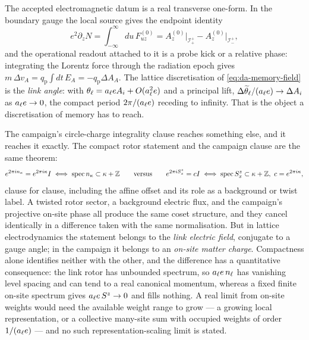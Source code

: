The accepted electromagnetic datum is a real transverse one-form. In the
boundary gauge the local source gives the endpoint identity
\begin{equation}
  e^2\partial_zN=\int_{-\infty}^{\infty}du\,F^{(0)}_{uz}
  =A^{(0)}_z\big|_{\mathcal I^+_+}-A^{(0)}_z\big|_{\mathcal I^+_-},
  \label{eq:da-memory-field}
\end{equation}
and the operational readout attached to it is a probe kick or a relative phase:
integrating the Lorentz force through the radiation epoch gives
$m\,\Delta v_A=q_{\mathrm p}\int dt\,E_A=-q_{\mathrm p}\Delta A_A$. The lattice
discretisation of \eqref{eq:da-memory-field} is the \emph{link angle}: with
$\theta_\ell=a_{\ell} e A_i+O(a_{\ell}^2e)$ and a principal lift,
$\Delta\widetilde\theta_\ell/(a_{\ell} e)\to\Delta A_i$ as $a_{\ell} e\to0$,
the compact period $2\pi/(a_{\ell} e)$ receding to infinity. That is the
object a discretisation of memory has to reach.

The campaign's circle-charge integrality clause reaches something else, and it
reaches it exactly. The compact rotor statement and the campaign clause are the
same theorem:
\begin{equation}
  e^{2\pi in_\kappa}=e^{2\pi i\kappa}I
  \iff
  \operatorname{spec} n_\kappa\subset\kappa+\mathbb{Z}
  \qquad\text{versus}\qquad
  e^{2\pi iS^z_x}=cI
  \iff
  \operatorname{spec} S^z_x\subset\kappa+\mathbb{Z},\ c=e^{2\pi i\kappa},
  \label{eq:da-int-clause}
\end{equation}
clause for clause, including the affine offset and its role as a background or
twist label. A twisted rotor sector, a background electric flux, and the
campaign's projective on-site phase all produce the same coset structure, and
they cancel identically in a difference taken with the same normalisation. But
in lattice electrodynamics the statement belongs to the \emph{link electric
field}, conjugate to a gauge angle; in the campaign it belongs to an
\emph{on-site matter charge}. Compactness alone identifies neither with the
other, and the difference has a quantitative consequence: the link rotor has
unbounded spectrum, so $a_{\ell} e\,n_\ell$ has vanishing level spacing and can
tend to a real canonical momentum, whereas a fixed finite on-site spectrum gives
$a_{\ell} e\,S^z\to0$ and fills nothing. A real limit from on-site weights
would need the available weight range to grow --- a growing local
representation, or a collective many-site sum with occupied weights of order
$1/(a_{\ell} e)$ --- and no such representation-scaling limit is stated.

